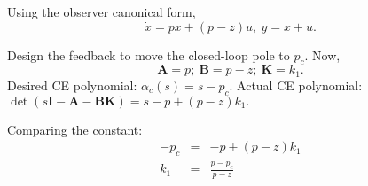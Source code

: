 Using the observer canonical form,
\[
\dot{x}=px+(p - z)u,\ y = x + u.
\]

Design the feedback to move the closed-loop pole to $p_c$.
Now,
\[
\mathbf{A}=p;\ \mathbf{B}=p-z;\ \mathbf{K}=k_1.
\]
Desired CE polynomial: $\alpha_c(s)=s-p_c$. Actual CE polynomial: 
$\det(s\mathbf{I}-\mathbf{A}-\mathbf{BK}) = s - p + (p - z)k_1.$

Comparing the constant:
\begin{eqnarray*}
	-p_c & = & -p + (p - z)k_1 \\
	k_1 & = & \frac{p-p_c}{p-z}
\end{eqnarray*}


\endinput

